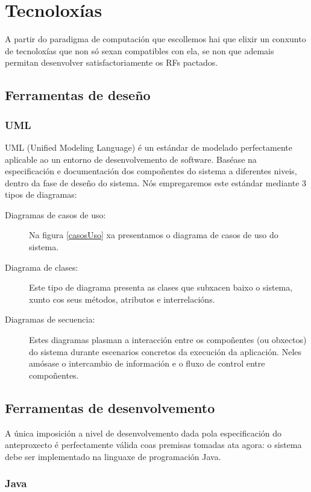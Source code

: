 \section{Tecnoloxías}

A partir do paradigma de computación que escollemos hai que elixir un conxunto de tecnoloxías que non só sexan compatibles con ela, se non que ademais permitan desenvolver satisfactoriamente os RFs pactados.

\subsection{Ferramentas de deseño}

\subsubsection{UML}

UML (Unified Modeling Language) é un estándar de modelado perfectamente aplicable ao un entorno de desenvolvemento de software. Baséase na especificación e documentación dos compoñentes do sistema a diferentes niveis, dentro da fase de deseño do sistema. Nós empregaremos este estándar mediante 3 tipos de diagramas:

\begin{description}
\item[Diagramas de casos de uso:] Na figura \ref{casosUso} xa presentamos o diagrama de casos de uso do sistema.
\item[Diagrama de clases:] Este tipo de diagrama presenta as clases que subxacen baixo o sistema, xunto cos seus métodos, atributos e interrelacións.
\item[Diagramas de secuencia:] Estes diagramas plasman a interacción entre os compoñentes (ou obxectos) do sistema durante escenarios concretos da execución da aplicación. Neles amósase o intercambio de información e o fluxo de control entre compoñentes.
\end{description} 

\subsection{Ferramentas de desenvolvemento}

A única imposición a nivel de desenvolvemento dada pola especificación do anteproxecto é perfectamente válida coas premisas tomadas ata agora: o sistema debe ser implementado na linguaxe de programación Java.

\subsubsection{Java}

